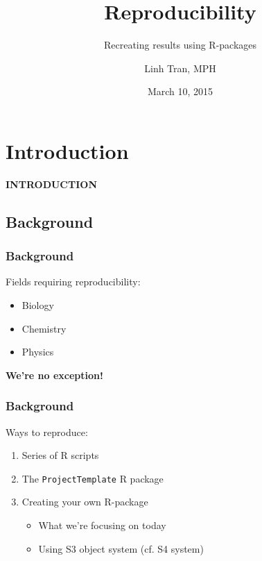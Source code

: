 \documentclass{beamer}
\title{Reproducibility}
\subtitle{Recreating results using R-packages}
\author{Linh Tran, MPH}
\date{March 10, 2015}
\institute[Universities of]
{
Group in Biostatistics \\
Univ of California, Berkeley
}
\begin{document}
\begin{frame}
\titlepage
{}
\end{frame}


\section{Introduction}
\begin{frame}
\fontsize{18}{7.2}\selectfont
\centering
\textbf{INTRODUCTION}
\end{frame}


\subsection{Background}
\begin{frame}
\frametitle{Background}
Fields requiring reproducibility:
\begin{itemize}
  \item Biology
  \item Chemistry
  \item Physics
\end{itemize}
\begin{center}
  \textbf{We're no exception!} \\
\end{center}
\end{frame}


\begin{frame}
\frametitle{Background}
Ways to reproduce:
\begin{enumerate}
  \item Series of R scripts
  \item The \texttt{ProjectTemplate} R package
  \item Creating your own R-package
  \begin{itemize}
  	\item What we're focusing on today
	\item Using S3 object system (cf. S4 system)
  \end{itemize}
\end{enumerate}
\end{frame}
\end{document}
